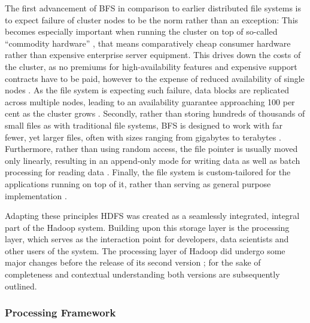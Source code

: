 The first advancement of \ac{BFS} in comparison to earlier distributed file systems is to expect failure of cluster nodes to be the norm rather than an exception: This becomes especially important when running the cluster on top of so-called \enquote{commodity hardware} \autocite[p.~1]{ghemawat2003gfs}, that means comparatively cheap consumer hardware rather than expensive enterprise server equipment. This drives down the costs of the cluster, as no premiums for high-availability features and expensive support contracts have to be paid, however to the expense of reduced availability of single nodes \autocite[p.~1]{ghemawat2003gfs}. As the file system is expecting such failure, data blocks are replicated across multiple nodes, leading to an availability guarantee approaching 100 per cent as the cluster grows \autocite[p.~2]{ghemawat2003gfs}. Secondly, rather than storing hundreds of thousands of small files as with traditional file systems, \ac{BFS} is designed to work with far fewer, yet larger files, often with sizes ranging from gigabytes to terabytes \autocite[p.~2]{ghemawat2003gfs}. Furthermore, rather than using random access, the file pointer is usually moved only linearly, resulting in an append-only mode for writing data as well as batch processing for reading data \autocite[p.~2]{ghemawat2003gfs}. Finally, the file system is custom-tailored for the applications running on top of it, rather than serving as general purpose implementation \autocite[p.~2]{ghemawat2003gfs}.

Adapting these principles \ac{HDFS} was created as a seamlessly integrated, integral part of the Hadoop system. Building upon this storage layer is the processing layer, which serves as the interaction point for developers, data scientists and other users of the system. The processing layer of Hadoop did undergo some major changes before the release of its second version \autocite[p.~5]{vavilapalli2013apache}; for the sake of completeness and contextual understanding both versions are subsequently outlined.

\subsubsection{Processing Framework}


